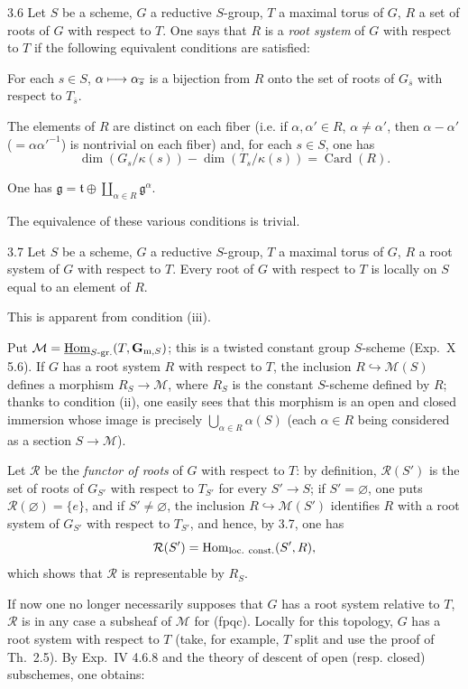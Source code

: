 \begin{definition}{3.6}\label{XIX.3.6}
Let $S$ be a scheme, $G$ a reductive $S$-group, $T$ a maximal torus of $G$, $R$ a set of roots of $G$ with respect to $T$. One says that $R$ is a \emph{root system} of $G$ with respect to $T$ if the following equivalent conditions are satisfied:
\begin{enumeratei}
\item For each $s\in S$, $\alpha\longmapsto\alpha_{\overline{s}}$ is a bijection from $R$ onto the set of roots of $G_{\overline{s}}$ with respect to $T_{\overline{s}}$.
\item The elements of $R$ are distinct on each fiber (i.e. if $\alpha,\alpha'\in R$, $\alpha\ne\alpha'$, then $\alpha-\alpha'$ ($=\alpha\alpha'^{-1}$) is nontrivial on each fiber) and, for each $s\in S$, one has
\[
\dim(G_s/\kappa(s))-\dim(T_s/\kappa(s))=\operatorname{Card}(R).
\]
\item One has $\mathfrak g=\mathfrak t\oplus\coprod_{\alpha\in R}\mathfrak g^\alpha$.
\end{enumeratei}
\end{definition}
The equivalence of these various conditions is trivial.

\begin{lemma}{3.7}\label{XIX.3.7}
Let $S$ be a scheme, $G$ a reductive $S$-group, $T$ a maximal torus of $G$, $R$ a root system of $G$ with respect to $T$. Every root of $G$ with respect to $T$ is locally on $S$ equal to an element of $R$.
\end{lemma}
This is apparent from condition (iii).

Put $\mathcal M=\underline{\operatorname{Hom}}_{S\text{-gr.}}(T,\mathbf{G}_{\mathrm m,S})$; this is a twisted constant group $S$-scheme (Exp.~X 5.6). If $G$ has a root system $R$ with respect to $T$, the inclusion $R\hookrightarrow\mathcal M(S)$ defines a morphism $R_S\to\mathcal M$, where $R_S$ is the constant $S$-scheme defined by $R$; thanks to condition (ii), one easily sees that this morphism is an open and closed immersion whose image is precisely $\bigcup_{\alpha\in R}\alpha(S)$ (each $\alpha\in R$ being considered as a section $S\to\mathcal M$).

Let $\mathcal R$ be the \emph{functor of roots} of $G$ with respect to $T$: by definition, $\mathcal R(S')$ is the set of roots of $G_{S'}$ with respect to $T_{S'}$ for every $S'\to S$; if $S'=\varnothing$, one puts $\mathcal R(\varnothing)=\{e\}$, and if $S'\ne\varnothing$, the inclusion $R\hookrightarrow\mathcal M(S')$ identifies $R$ with a root system of $G_{S'}$ with respect to $T_{S'}$, and hence, by 3.7, one has
\[
\mathcal R(S')=\operatorname{Hom}_{\mathrm{loc.\ const.}}(S',R),
\]
which shows that $\mathcal R$ is representable by $R_S$.

If now one no longer necessarily supposes that $G$ has a root system relative to $T$, $\mathcal R$ is in any case a subsheaf of $\mathcal M$ for (fpqc). Locally for this topology, $G$ has a root system with respect to $T$ (take, for example, $T$ split and use the proof of Th.~2.5). By Exp.~IV 4.6.8 and the theory of descent of open (resp. closed) subschemes,{\renewcommand{\thefootnote}{(31)}} one obtains:

